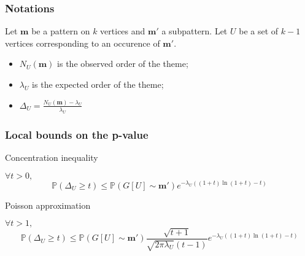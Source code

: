 \documentclass{beamer}
\newcommand{\proba}{\mathbb{P}}
\newcommand{\Num}{N_U(\mot)}
\newcommand{\mot}{\mathbf{m}}
\begin{document}
\begin{frame}
\frametitle{Notations}

Let $\mot$ be a pattern on $k$ vertices  and $\mot'$ a subpattern.
Let $U$ be a set of $k-1$ vertices corresponding to an occurence of $\mot'$.
\begin{itemize}
\item $\Num$ is the observed order of the theme;
\item $\lambda_U$ is the expected order of the theme;
\item $\Delta_U=\frac{\Num-\lambda_U}{\lambda_U}$
\end{itemize}


\begin{figure} [htb] 
\begin{center}
\psfrag{m1}{$\mot_1$}
\psfrag{m2}{$\mot_2$}
\end{center}
\end{figure}

\end{frame}



\begin{frame}
\frametitle{Local bounds on the p-value}

\begin{description}
\item[Concentration inequality]
\end{description}
$ \forall t>0, $
$$
\proba(\Delta_U \geq t) \leq  \proba(G[U] \sim \mot')  e^{-\lambda_U ((1+t)\ln(1+t) -t)} 
$$

\begin{description}
\item[Poisson approximation] 
\end{description}
$ \forall t>1, $
$$
\proba(\Delta_U \geq t) \leq  \proba(G[U] \sim \mot') \frac{\sqrt{t+1}}{\sqrt{2\pi \lambda_U} (t-1)} e^{-\lambda_U ((1+t)\ln(1+t) -t)} 
$$



\end{frame}
\end{document}
